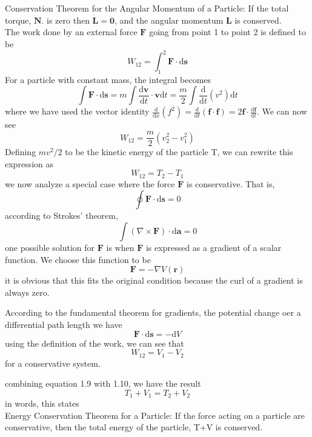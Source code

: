 \documentclass[]{article}
\numberwithin{equation}{section}
\begin{document}
Conservation Theorem for the Angular Momentum of a Particle: If the total torque, $\mathbf N$. is zero then $\dot{\mathbf L}=\mathbf 0$,  and the angular momentum $\mathbf L$ is conserved.\\

The work done by an external force $\mathbf F$ going from point 1 to point 2 is defined to be 
\begin{equation}W_{12}=\int^2_1\mathbf F\cdot\mathrm d\mathbf s\end{equation}
For a particle with constant mass, the integral becomes
$$\int\mathbf F\cdot\mathrm d\mathbf s=m\int\frac{\mathrm d\mathbf v}{\mathrm dt}\cdot\mathbf v\mathrm dt=\frac m2\int\frac{\mathrm d}{\mathrm dt}(v^2)\mathrm dt$$
where we have used the vector identity $\frac{\mathrm d}{\mathrm dx}(f^2)=\frac{\mathrm d}{\mathrm dt}(\mathbf f\cdot\mathbf f)=2\mathbf f\cdot \frac{\mathrm d\mathbf f}{\mathrm dt}$. We can now see 
$$W_{12}=\frac m2(v^2_2-v^2_1)$$
Defining $mv^2/2$ to be the kinetic energy of the particle T, we can rewrite this expression as 
\begin{equation}W_{12}=T_2-T_1\end{equation}
we now analyze a special case where the force $\mathbf F$ is conservative. That is,
$$\oint\mathbf F\cdot\mathrm d\mathbf s=0$$
according to Strokes' theorem, 
$$\int(\nabla\times\mathbf F)\cdot\mathrm d\mathbf a=0$$
one possible solution for $\mathbf F$ is when $\mathbf F$ is expressed as a gradient of a scalar function. We choose this function to be 
$$\mathbf F=-\nabla V(\mathbf r)$$
it is obvious that this fits the original condition because the curl of a gradient is always zero. 

According to the fundamental theorem for gradients, the potential change oer a differential path length we have
$$\mathbf F\cdot\mathrm d\mathbf s=-\mathrm dV$$
using the definition of the work, we can see that 
\begin{equation}W_{12}=V_1-V_2\end{equation}
for a conservative system.

combining equation 1.9 with 1.10, we have the result
\begin{equation}\boxed{T_1+V_1=T_2+V_2}\end{equation}
in words, this states\\

Energy Conservation Theorem for a Particle: If the force acting on a particle are conservative, then the total energy of the particle, T+V is conserved.
\end{document}
